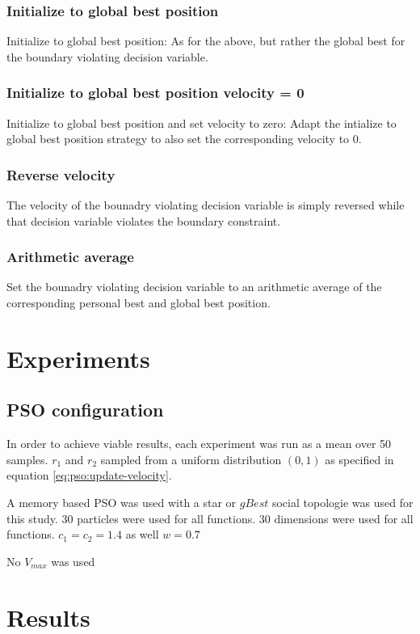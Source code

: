 \documentclass[conference]{IEEEtran}
\begin{document}
\subsubsection{\textbf{Initialize to global best position}}
Initialize to global best position: As for the above, but rather the global best for the boundary violating decision variable.

\subsubsection{\textbf{Initialize to global best position velocity = 0}}
Initialize to global best position and set velocity to zero: Adapt the intialize to global best position strategy to also set the corresponding velocity to 0.

\subsubsection{\textbf{Reverse velocity}}
The velocity of the bounadry violating decision variable is simply reversed while that decision variable violates the boundary constraint.

\subsubsection{\textbf{Arithmetic average}}
Set the bounadry violating decision variable to an arithmetic average of the corresponding personal best and global best position.

\section{Experiments}
    \subsection{\ac{PSO} configuration}
    In order to achieve viable results, each experiment was run as a mean over 50 samples. $r_1$ and $r_2$ sampled from a uniform distribution $ (0, 1) $ as specified in equation \ref{eq:pso:update-velocity}.
    
    A memory based \ac{PSO} was used with a star or $ gBest $ social topologie was used for this study. 30 particles were used for all functions. 30 dimensions were used for all functions. $ c_1 = c_2 = 1.4 $ as well $ w = 0.7 $

    No $ V_{max} $ was used

\section{Results}
\end{document}
